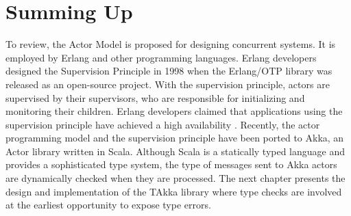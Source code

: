 
\section{Summing Up}

To review, the Actor Model \citep{Hewitt:1973} is proposed for designing 
concurrent systems. It is employed by Erlang  \citep{ArmstrongErlang} and other 
programming languages. Erlang developers designed the Supervision Principle in 
1998 when the Erlang/OTP library was released as an open-source project.  With 
the supervision principle, actors are supervised by their supervisors, who are 
responsible for initializing and monitoring their children.  Erlang developers 
claimed that applications using the supervision principle have achieved a 
high availability \citep{ArmstrongAXD}. Recently, the actor programming model 
and the supervision principle have been ported to Akka, an Actor library 
written in Scala.  Although Scala is a statically typed language and provides a 
sophisticated type system, the type of messages sent to Akka actors are 
dynamically checked when they are processed.  The next chapter presents the 
design and implementation of the TAkka library where type checks are involved
at the earliest opportunity to expose type errors.




